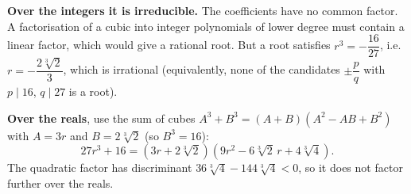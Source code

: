 \textbf{Over the integers it is irreducible.} The coefficients have no common factor. A factorisation of a cubic into integer polynomials of lower degree must contain a linear factor, which would give a rational root. But a root satisfies $r^3=-\dfrac{16}{27}$, i.e.\ $r=-\dfrac{2\sqrt[3]{2}}{3}$, which is irrational (equivalently, none of the candidates $\pm\dfrac {p}{q}$ with $p\mid16$, $q\mid27$ is a root).

\textbf{Over the reals}, use the sum of cubes $A^3+B^3=(A+B)(A^2-AB+B^2)$ with $A=3r$ and $B=2\sqrt[3]{2}$ (so $B^3=16$):
\[
27r^3+16=\boxed{\left(3r+2\sqrt[3]{2}\right)\left(9r^2-6\sqrt[3]{2}\,r+4\sqrt[3]{4}\right)} .
\]
The quadratic factor has discriminant $36\sqrt[3]{4}-144\sqrt[3]{4}<0$, so it does not factor further over the reals.
